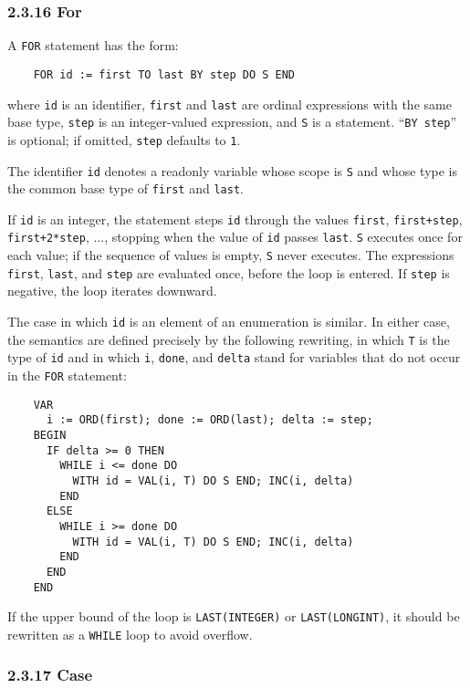 \documentclass[10pt]{article}
\begin{document}
\subsubsection*{2.3.16 For}

A \verb|FOR| statement has the form:
\begin{verbatim}
    FOR id := first TO last BY step DO S END
\end{verbatim}
where \verb|id| is an identifier, \verb|first| and \verb|last| are ordinal
expressions with the same base type, \verb|step| is an integer-valued
expression, and \verb|S| is a statement.  ``\verb|BY step|'' is optional; if
omitted, \verb|step| defaults to \verb|1|.

The identifier \verb|id| denotes a readonly variable whose scope is \verb|S|
and whose type is the common base type of \verb|first| and \verb|last|.

If \verb|id| is an integer, the statement steps \verb|id| through the values
\verb|first|, \verb|first+step|, \verb|first+2*step|, ..., stopping when the
value of \verb|id| passes \verb|last|.  \verb|S| executes once for each value;
if the sequence of values is empty, \verb|S| never executes.  The expressions
\verb|first|, \verb|last|, and \verb|step| are evaluated once, before the loop
is entered.  If \verb|step| is negative, the loop iterates downward.

The case in which \verb|id| is an element of an enumeration is similar.  In
either case, the semantics are defined precisely by the following rewriting,
in which \verb|T| is the type of \verb|id| and in which \verb|i|, \verb|done|,
and \verb|delta| stand for variables that do not occur in the \verb|FOR|
statement:
\begin{verbatim}
    VAR
      i := ORD(first); done := ORD(last); delta := step;
    BEGIN
      IF delta >= 0 THEN
        WHILE i <= done DO
          WITH id = VAL(i, T) DO S END; INC(i, delta)
        END
      ELSE
        WHILE i >= done DO
          WITH id = VAL(i, T) DO S END; INC(i, delta)
        END
      END
    END
\end{verbatim}

If the upper bound of the loop is \verb|LAST(INTEGER)| or
\verb|LAST(LONGINT)|, it should be rewritten as a \verb|WHILE| loop to avoid
overflow.

\subsubsection*{2.3.17 Case}
\end{document}
